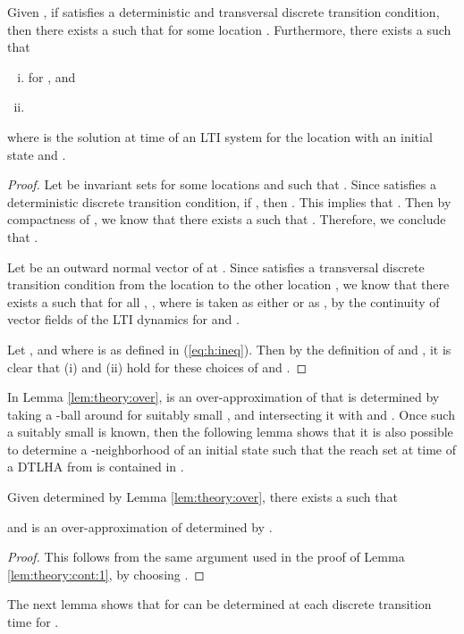 \begin{lem} \label{lem:theory:over}
Given , if  satisfies a deterministic and transversal discrete transition condition, then there exists a  such that  for some location . Furthermore, there exists a  such that
\begin{enumerate}[(i)]
    \item  for  , and
    \item 
\end{enumerate}
where  is the solution at time  of an LTI system for the location  with an initial state  and . 
\end{lem}
\begin{proof}
Let  be invariant sets for some locations  and  such that .
Since  satisfies a deterministic discrete transition condition, if , then .
This implies that .
Then by compactness of , we know that there exists a  such that . Therefore, we conclude that .

Let  be an outward normal vector of  at .
Since  satisfies a transversal discrete transition condition from the location  to the other location , we know that there exists a  such that for all , , where  is taken as either  or as , by the continuity of vector fields of the LTI dynamics for  and .

Let , and  where  is as defined in (\ref{eq:h:ineq}).
Then by the definition of  and , it is clear that (i) and (ii) hold for these choices of  and .
\end{proof}



In Lemma \ref{lem:theory:over},  is an over-approximation of  that is determined by taking a -ball around  for suitably small , and intersecting it with  and . Once such a suitably small  is known, then the following lemma shows that it is also possible to determine a -neighborhood of an initial state  such that the reach set at time  of a DTLHA  from  is contained in .

\begin{lem} \label{lem:theory:over:cont:1}
Given  determined by Lemma \ref{lem:theory:over}, there exists a  such that

and  is an over-approximation of  determined by .
\end{lem}
\begin{proof}
This follows from the same argument used in the proof of Lemma \ref{lem:theory:cont:1}, by choosing .
\end{proof}

The next lemma shows that  for  can be determined at each discrete transition time  for .

